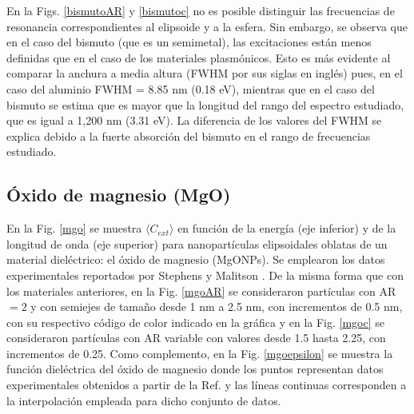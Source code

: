 En la Figs. \ref{bismutoAR} y \ref{bismutoc} no es posible distinguir las frecuencias de resonancia correspondientes al elipsoide y a la esfera. Sin embargo, se observa que en el caso del bismuto (que es un semimetal), las excitaciones están menos definidas que en el caso de los materiales plasmónicos. Esto es más evidente al comparar la anchura a media altura (FWHM por sus siglas en inglés) pues, en el caso del aluminio FWHM = 8.85 nm (0.18 eV), mientras que en el caso del bismuto se estima que es mayor que la longitud del rango del espectro estudiado, que es igual a 1,200 nm (3.31 eV). La diferencia de los valores del FWHM se explica debido a la fuerte absorción del bismuto en el rango de frecuencias estudiado.


\subsection*{Óxido de magnesio (MgO)}
En la Fig. \ref{mgo} se muestra $\langle C_{ext}\rangle$ en función de la energía (eje inferior) y de la longitud de onda (eje superior) para nanopartículas elipsoidales oblatas de un material dieléctrico: el óxido de magnesio (MgONPs). Se emplearon los datos experimentales reportados por Stephens y Malitson \cite{MgO}. De la misma forma que con los materiales anteriores, en la Fig. \ref{mgoAR} se consideraron partículas con AR$=2$ y  con semiejes de tamaño desde 1  nm a 2.5 nm, con incrementos de 0.5 nm, con su respectivo código de color indicado en la gráfica y en la Fig. \ref{mgoc} se consideraron partículas con AR variable con valores desde 1.5 hasta 2.25, con incrementos de 0.25.  Como complemento, en la Fig. \ref{mgoepsilon} se muestra la función dieléctrica del óxido de magnesio donde los puntos representan datos experimentales obtenidos a partir de la Ref. \cite{MgO} y las líneas continuas corresponden a la interpolación empleada para dicho conjunto de datos.\\

